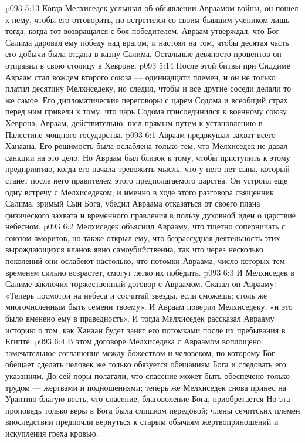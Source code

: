 \vs p093 5:13 Когда Мелхиседек услышал об объявлении Авраамом войны, он пошел к нему, чтобы его отговорить, но встретился со своим бывшим учеником лишь тогда, когда тот возвращался с боя победителем. Авраам утверждал, что Бог Салима даровал ему победу над врагом, и настоял на том, чтобы десятая часть его добычи была отдана в казну Салима. Остальные девяносто процентов он отправил в свою столицу в Хевроне.
\vs p093 5:14 После этой битвы при Сиддиме Авраам стал вождем второго союза --- одиннадцати племен, и он не только платил десятину Мелхиседеку, но следил, чтобы и все другие соседи делали то же самое. Его дипломатические переговоры с царем Содома и всеобщий страх перед ним привели к тому, что царь Содома присоединился к военному союзу Хеврона; Авраам, действительно, шел прямым путем к установлению в Палестине мощного государства.
\vs p093 6:1 Авраам предвкушал захват всего Ханаана. Его решимость была ослаблена только тем, что Мелхиседек не давал санкции на это дело. Но Авраам был близок к тому, чтобы приступить к этому предприятию, когда его начала тревожить мысль, что у него нет сына, который станет после него правителем этого предполагаемого царства. Он устроил еще одну встречу с Мелхиседеком; и именно в ходе этого разговора священник Салима, зримый Сын Бога, убедил Авраама отказаться от своего плана физического захвата и временного правления в пользу духовной идеи о царствие небесном.
\vs p093 6:2 Мелхиседек объяснил Аврааму, что тщетно соперничать с союзом аморитов, но также открыл ему, что безрассудная деятельность этих вырождающихся кланов явно самоубийственна, так что через несколько поколений они ослабеют настолько, что потомки Авраама, число которых тем временем сильно возрастет, смогут легко их победить.
\vs p093 6:3 И Мелхиседек в Салиме заключил торжественный договор с Авраамом. Сказал он Аврааму: «Теперь посмотри на небеса и сосчитай звезды, если сможешь; столь же многочисленным быть семени твоему». И Авраам поверил Мелхиседеку, «и это было вменено ему в праведность». И тогда Мелхиседек рассказал Аврааму историю о том, как Ханаан будет занят его потомками после их пребывания в Египте.
\vs p093 6:4 \pc В этом договоре Мелхиседека с Авраамом воплощено замечательное соглашение между божеством и человеком, по которому Бог обещает сделать  человек же только обязуется  обещаниям Бога и следовать его указаниям. До сей поры полагали, что спасение может быть обеспечено только трудом --- жертвами и подношениями; теперь же Мелхиседек снова принес на Урантию благую весть, что спасение, благоволение Бога, приобретается  Но эта проповедь только веры в Бога была слишком передовой; члены семитских племен впоследствии предпочли вернуться к старым обычаям жертвоприношений и искупления греха кровью.
